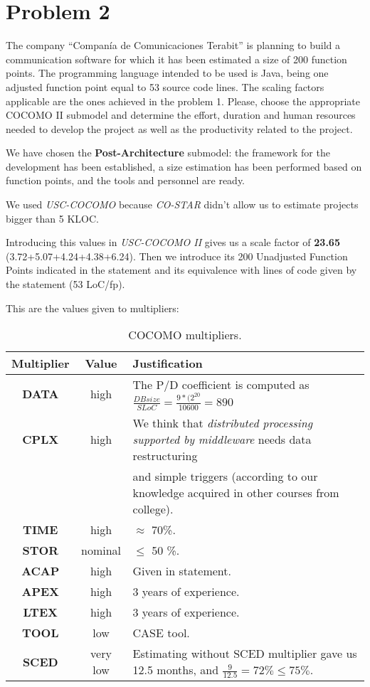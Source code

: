 \section{Problem 2}

The company ``Compan\'ia de Comunicaciones Terabit'' is planning to build a communication software for which it has been estimated a size of 200 function points. The programming language intended to be used is Java, being one adjusted function point equal to 53 source code lines. The scaling factors applicable are the ones achieved in the problem 1. Please, choose the appropriate COCOMO II submodel and determine the effort, duration and human resources needed to develop the project as well as the productivity related to the project.

\seprule

We have chosen the \textbf{Post-Architecture} submodel: the framework for the development has been established, a size estimation has been performed based on function points, and the tools and personnel are ready.

We used \textit{USC-COCOMO} because \textit{CO-STAR} didn't allow us to estimate projects bigger than 5 KLOC. 

Introducing this values in \textit{USC-COCOMO II} gives us a scale factor of \textbf{23.65} (3.72+5.07+4.24+4.38+6.24). Then we introduce its 200 Unadjusted Function Points indicated in the statement and its equivalence with lines of code given by the statement (53 LoC/fp).

This are the values given to multipliers:

\begin{table}[hbtp]
\centering
\begin{tabular}{|c|c|l|}
\hline
\textbf{Multiplier} & \textbf{Value} & \textbf{Justification} \\ \hline
\textbf{DATA} & high & The P/D coefficient is computed as $\frac{DB size}{SLoC} = \frac{9*(2^{20}}{10600} = 890$\\ \hline
\textbf{CPLX} & high & We think that \textit{distributed processing supported by middleware} needs data restructuring\\ & & and simple triggers (according to our knowledge acquired in other courses from college). \\ \hline
\textbf{TIME} & high & $\approx$ 70\%.  \\ \hline
\textbf{STOR} & nominal & $\leq$ 50 \%. \\ \hline
\textbf{ACAP} & high & Given in statement. \\ \hline
\textbf{APEX} & high & 3 years of experience. \\ \hline
\textbf{LTEX} & high & 3 years of experience. \\ \hline
\textbf{TOOL} & low & CASE tool. \\ \hline
\textbf{SCED} & very low & Estimating without SCED multiplier gave us 12.5 months, and $\frac{9}{12.5}=72\% \leq 75\%$. \\\hline
\end{tabular}
\caption{COCOMO multipliers.}
\label{tblMultipliersProblem2}
\end{table}

